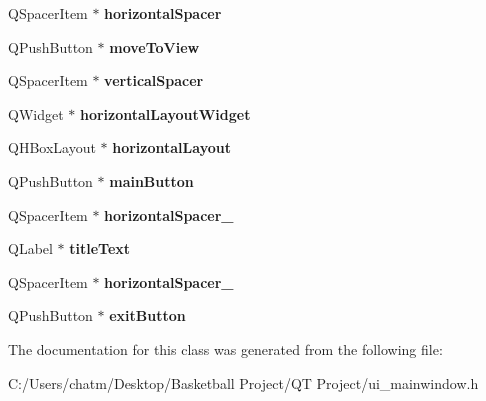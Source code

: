 \begin{DoxyCompactItemize}
Q\+Spacer\+Item $\ast$ {\bfseries horizontal\+Spacer}
\item 
\mbox{\label{class_ui___main_window_ad9801547cfce7c5d19b427123105f0b2}} 
Q\+Push\+Button $\ast$ {\bfseries move\+To\+View}
\item 
\mbox{\label{class_ui___main_window_a8384329c3663ff274e926a12024aab52}} 
Q\+Spacer\+Item $\ast$ {\bfseries vertical\+Spacer}
\item 
\mbox{\label{class_ui___main_window_a9271976c4376de565bfe96c296f4db1e}} 
Q\+Widget $\ast$ {\bfseries horizontal\+Layout\+Widget}
\item 
\mbox{\label{class_ui___main_window_acd6fdc9ebacc4b25b834162380d75ce8}} 
Q\+H\+Box\+Layout $\ast$ {\bfseries horizontal\+Layout}
\item 
\mbox{\label{class_ui___main_window_a5c315d3186a5bca7e7d71fb3c41057b3}} 
Q\+Push\+Button $\ast$ {\bfseries main\+Button}
\item 
\mbox{\label{class_ui___main_window_ae2007c6e48638f819d3ac57be8daa4ca}} 
Q\+Spacer\+Item $\ast$ {\bfseries horizontal\+Spacer\+\_}
\item 
\mbox{\label{class_ui___main_window_a892390c810f5c91a93dc843de90cf433}} 
Q\+Label $\ast$ {\bfseries title\+Text}
\item 
\mbox{\label{class_ui___main_window_a4fc05b11984637298795a354792c4023}} 
Q\+Spacer\+Item $\ast$ {\bfseries horizontal\+Spacer\+\_}
\item 
\mbox{\label{class_ui___main_window_a0a94b420ba46214964527b8bbdf424ad}} 
Q\+Push\+Button $\ast$ {\bfseries exit\+Button}
\end{DoxyCompactItemize}


The documentation for this class was generated from the following file\+:\begin{DoxyCompactItemize}
\item 
C\+:/\+Users/chatm/\+Desktop/\+Basketball Project/\+Q\+T Project/ui\+\_\+mainwindow.\+h\end{DoxyCompactItemize}
